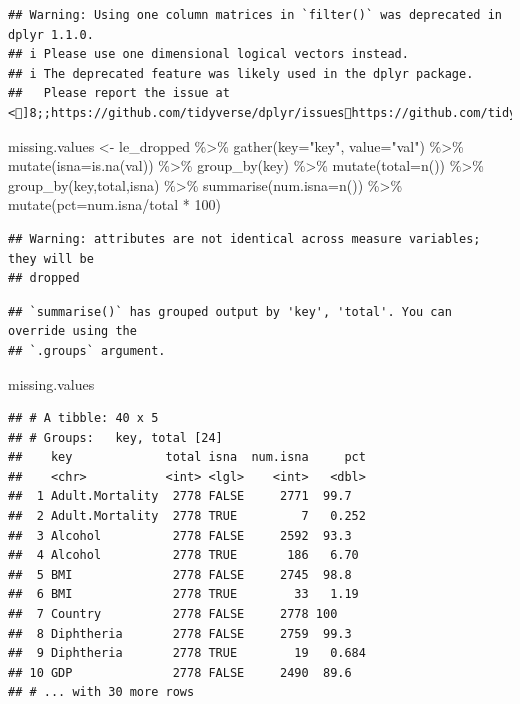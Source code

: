 \documentclass[
]{article}
\newenvironment{Shaded}{\begin{snugshade}}{\end{snugshade}}
\newcommand{\AttributeTok}[1]{\textcolor[rgb]{0.77,0.63,0.00}{#1}}
\newcommand{\DecValTok}[1]{\textcolor[rgb]{0.00,0.00,0.81}{#1}}
\newcommand{\FunctionTok}[1]{\textcolor[rgb]{0.00,0.00,0.00}{#1}}
\newcommand{\NormalTok}[1]{#1}
\newcommand{\OtherTok}[1]{\textcolor[rgb]{0.56,0.35,0.01}{#1}}
\newcommand{\SpecialCharTok}[1]{\textcolor[rgb]{0.00,0.00,0.00}{#1}}
\newcommand{\StringTok}[1]{\textcolor[rgb]{0.31,0.60,0.02}{#1}}
\begin{document}
\begin{verbatim}
## Warning: Using one column matrices in `filter()` was deprecated in dplyr 1.1.0.
## i Please use one dimensional logical vectors instead.
## i The deprecated feature was likely used in the dplyr package.
##   Please report the issue at <]8;;https://github.com/tidyverse/dplyr/issueshttps://github.com/tidyverse/dplyr/issues]8;;>.
\end{verbatim}

\begin{Shaded}
\begin{Highlighting}[]
\NormalTok{missing.values }\OtherTok{\textless{}{-}}\NormalTok{ le\_dropped }\SpecialCharTok{\%\textgreater{}\%}
  \FunctionTok{gather}\NormalTok{(}\AttributeTok{key=}\StringTok{"key"}\NormalTok{, }\AttributeTok{value=}\StringTok{"val"}\NormalTok{) }\SpecialCharTok{\%\textgreater{}\%}
  \FunctionTok{mutate}\NormalTok{(}\AttributeTok{isna=}\FunctionTok{is.na}\NormalTok{(val)) }\SpecialCharTok{\%\textgreater{}\%}
  \FunctionTok{group\_by}\NormalTok{(key) }\SpecialCharTok{\%\textgreater{}\%}
  \FunctionTok{mutate}\NormalTok{(}\AttributeTok{total=}\FunctionTok{n}\NormalTok{()) }\SpecialCharTok{\%\textgreater{}\%}
  \FunctionTok{group\_by}\NormalTok{(key,total,isna) }\SpecialCharTok{\%\textgreater{}\%}
  \FunctionTok{summarise}\NormalTok{(}\AttributeTok{num.isna=}\FunctionTok{n}\NormalTok{()) }\SpecialCharTok{\%\textgreater{}\%}
  \FunctionTok{mutate}\NormalTok{(}\AttributeTok{pct=}\NormalTok{num.isna}\SpecialCharTok{/}\NormalTok{total }\SpecialCharTok{*} \DecValTok{100}\NormalTok{)}
\end{Highlighting}
\end{Shaded}

\begin{verbatim}
## Warning: attributes are not identical across measure variables; they will be
## dropped
\end{verbatim}

\begin{verbatim}
## `summarise()` has grouped output by 'key', 'total'. You can override using the
## `.groups` argument.
\end{verbatim}

\begin{Shaded}
\begin{Highlighting}[]
\NormalTok{missing.values}
\end{Highlighting}
\end{Shaded}

\begin{verbatim}
## # A tibble: 40 x 5
## # Groups:   key, total [24]
##    key             total isna  num.isna     pct
##    <chr>           <int> <lgl>    <int>   <dbl>
##  1 Adult.Mortality  2778 FALSE     2771  99.7  
##  2 Adult.Mortality  2778 TRUE         7   0.252
##  3 Alcohol          2778 FALSE     2592  93.3  
##  4 Alcohol          2778 TRUE       186   6.70 
##  5 BMI              2778 FALSE     2745  98.8  
##  6 BMI              2778 TRUE        33   1.19 
##  7 Country          2778 FALSE     2778 100    
##  8 Diphtheria       2778 FALSE     2759  99.3  
##  9 Diphtheria       2778 TRUE        19   0.684
## 10 GDP              2778 FALSE     2490  89.6  
## # ... with 30 more rows
\end{verbatim}
\end{document}
